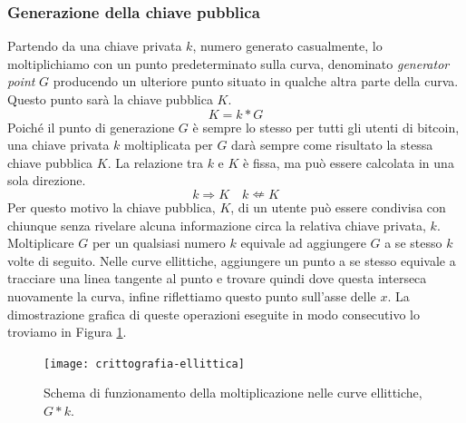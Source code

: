 \subsubsection{Generazione della chiave pubblica}
Partendo da una chiave privata $k$, numero generato casualmente, lo moltiplichiamo con un punto predeterminato sulla curva, denominato \textit{generator point} $G$ producendo un ulteriore punto situato in qualche altra parte della curva. Questo punto sarà la chiave pubblica $K$. 
\[ K=k*G\]
Poiché il punto di generazione $G$ è sempre lo stesso per tutti gli utenti di bitcoin, una chiave privata $k$ moltiplicata per $G$ darà sempre come risultato la stessa chiave pubblica $K$. La relazione tra $k$ e $K$ è fissa, ma può essere calcolata in una sola direzione.
\[ k \Rightarrow K \quad k \nLeftarrow K\]
Per questo motivo la chiave pubblica, $K$, di un utente può essere condivisa con chiunque senza rivelare alcuna informazione circa la relativa chiave privata, $k$.
Moltiplicare $G$ per un qualsiasi numero $k$ equivale ad aggiungere $G$ a se stesso $k$ volte di seguito. Nelle curve ellittiche, aggiungere un punto a se stesso equivale a tracciare una linea tangente al punto e trovare quindi dove questa interseca nuovamente la curva, infine riflettiamo questo punto sull'asse delle $x$. La dimostrazione grafica di queste operazioni eseguite in modo consecutivo lo troviamo in Figura \ref{fig:crittografia-ellittica}.
\begin{figure}
	\centering 
	\texttt{[image: crittografia-ellittica]} 
	\caption[Crittografia Ellittica]{Schema di funzionamento della moltiplicazione nelle curve ellittiche, $G*k$.}
	\label{fig:crittografia-ellittica} 
\end{figure}

